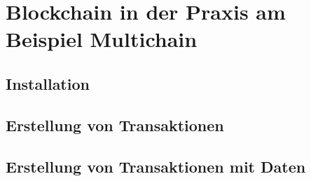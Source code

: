 \section{Blockchain in der Praxis am Beispiel Multichain}
\label{sec:Praxis}

\subsection{Installation}
\label{subsec:inst}

\subsection{Erstellung von Transaktionen}
\label{subsec:trans-erstellung}

\subsection{Erstellung von Transaktionen mit Daten}
\label{subsec:trans-erstellung-mit-daten}
